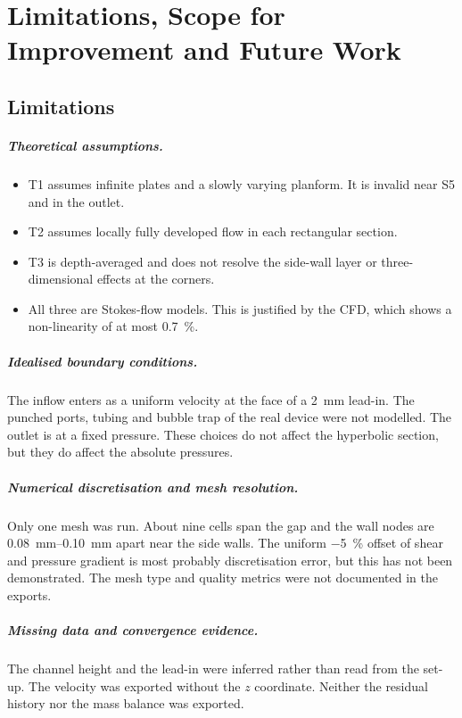 \chapter{Limitations, Scope for Improvement and Future Work}
\label{ch:limitations}

\section{Limitations}

\paragraph{Theoretical assumptions.}
\begin{itemize}
\item T1 assumes infinite plates and a slowly varying planform. It is invalid near S5 and in the outlet.
\item T2 assumes locally fully developed flow in each rectangular section.
\item T3 is depth-averaged and does not resolve the side-wall layer or three-dimensional effects at the corners.
\item All three are Stokes-flow models. This is justified by the CFD, which shows a non-linearity of at most \SI{0.7}{\percent}.
\end{itemize}

\paragraph{Idealised boundary conditions.} The inflow enters as a uniform velocity at the face of a \SI{2}{mm} lead-in. The punched ports, tubing and bubble trap of the real device were not modelled. The outlet is at a fixed pressure. These choices do not affect the hyperbolic section, but they do affect the absolute pressures.

\paragraph{Numerical discretisation and mesh resolution.} Only one mesh was run. About nine cells span the gap and the wall nodes are \SIrange{0.08}{0.10}{mm} apart near the side walls. The uniform \SI{-5}{\percent} offset of shear and pressure gradient is most probably discretisation error, but this has not been demonstrated. The mesh type and quality metrics were not documented in the exports.

\paragraph{Missing data and convergence evidence.} The channel height and the lead-in were inferred rather than read from the set-up. The velocity was exported without the $z$ coordinate. Neither the residual history nor the mass balance was exported.

